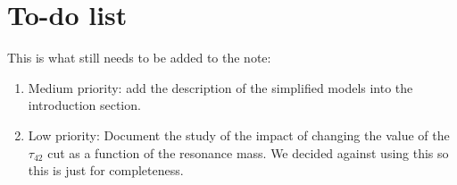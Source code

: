 \section*{To-do list}

This is what still needs to be added to the note:

\begin{enumerate}




\item Medium priority: add the description of the simplified models
  into the introduction section.

\item Low priority: Document the study of the impact of changing the value of
  the $\tau_{42}$ cut as a function of the resonance mass.  We decided
  against using this so this is just for completeness.


\end{enumerate}



